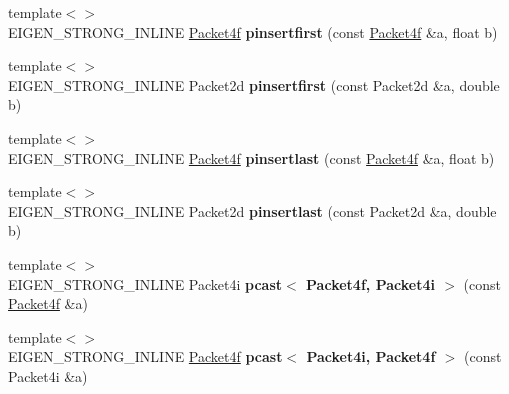 \begin{DoxyCompactItemize}
{\footnotesize template$<$$>$ }\\E\+I\+G\+E\+N\+\_\+\+S\+T\+R\+O\+N\+G\+\_\+\+I\+N\+L\+I\+NE \hyperlink{struct_eigen_1_1internal_1_1_packet4f}{Packet4f} {\bfseries pinsertfirst} (const \hyperlink{struct_eigen_1_1internal_1_1_packet4f}{Packet4f} \&a, float b)
\item 
\mbox{\label{namespace_eigen_1_1internal_a757c18cc3482e703a82957d569eaf078}} 
{\footnotesize template$<$$>$ }\\E\+I\+G\+E\+N\+\_\+\+S\+T\+R\+O\+N\+G\+\_\+\+I\+N\+L\+I\+NE Packet2d {\bfseries pinsertfirst} (const Packet2d \&a, double b)
\item 
\mbox{\label{namespace_eigen_1_1internal_a09a62507f084d45ac1abc6bc53d619a7}} 
{\footnotesize template$<$$>$ }\\E\+I\+G\+E\+N\+\_\+\+S\+T\+R\+O\+N\+G\+\_\+\+I\+N\+L\+I\+NE \hyperlink{struct_eigen_1_1internal_1_1_packet4f}{Packet4f} {\bfseries pinsertlast} (const \hyperlink{struct_eigen_1_1internal_1_1_packet4f}{Packet4f} \&a, float b)
\item 
\mbox{\label{namespace_eigen_1_1internal_a68c30f158b76175b68094310be8c9a7d}} 
{\footnotesize template$<$$>$ }\\E\+I\+G\+E\+N\+\_\+\+S\+T\+R\+O\+N\+G\+\_\+\+I\+N\+L\+I\+NE Packet2d {\bfseries pinsertlast} (const Packet2d \&a, double b)
\item 
\mbox{\label{namespace_eigen_1_1internal_abda77c788d4df187c3a0c560b40ce7f7}} 
{\footnotesize template$<$$>$ }\\E\+I\+G\+E\+N\+\_\+\+S\+T\+R\+O\+N\+G\+\_\+\+I\+N\+L\+I\+NE Packet4i {\bfseries pcast$<$ Packet4f, Packet4i $>$} (const \hyperlink{struct_eigen_1_1internal_1_1_packet4f}{Packet4f} \&a)
\item 
\mbox{\label{namespace_eigen_1_1internal_a775cfd8f6fc50e460760f68fda93a9ba}} 
{\footnotesize template$<$$>$ }\\E\+I\+G\+E\+N\+\_\+\+S\+T\+R\+O\+N\+G\+\_\+\+I\+N\+L\+I\+NE \hyperlink{struct_eigen_1_1internal_1_1_packet4f}{Packet4f} {\bfseries pcast$<$ Packet4i, Packet4f $>$} (const Packet4i \&a)
\item 
\mbox{\label{namespace_eigen_1_1internal_ae559e83ea5635f7ce1c4da8a1b6f0a0c}} 

\end{DoxyCompactItemize}
